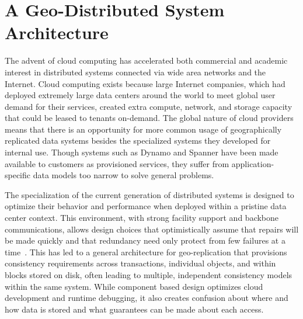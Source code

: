 
\renewcommand{\thechapter}{2}

\chapter{A Geo-Distributed System Architecture}
\label{ch:architecture}




The advent of cloud computing has accelerated both commercial and academic interest in distributed systems connected via wide area networks and the Internet.
Cloud computing exists because large Internet companies, which had deployed extremely large data centers around the world to meet global user demand for their services, created extra compute, network, and storage capacity that could be leased to tenants on-demand.
The global nature of cloud providers means that there is an opportunity for more common usage of geographically replicated data systems besides the specialized systems they developed for internal use.
Though systems such as Dynamo and Spanner have been made available to customers as provisioned services, they suffer from application-specific data models too narrow to solve general problems.

The specialization of the current generation of distributed systems is designed to optimize their behavior and performance when deployed within a pristine data center context.
This environment, with strong facility support and backbone communications, allows design choices that optimistically assume that repairs will be made quickly and that redundancy need only protect from few failures at a time~\cite{bermbach_eventual_2011,wada_data_2011,node_failure,jhawar_fault_2013}.
This has led to a general architecture for geo-replication that provisions consistency requirements across transactions, individual objects, and within blocks stored on disk, often leading to multiple, independent consistency models within the same system.
While component based design optimizes cloud development and runtime debugging, it also creates confusion about where and how data is stored and what guarantees can be made about each access.

